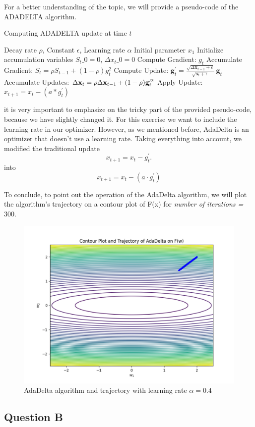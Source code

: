 For a better understanding of the topic, we will provide a pseudo-code of the ADADELTA algorithm.
	\begin{algorithm}[H]
		\caption{Computing ADADELTA update at time $t$}
		\begin{algorithmic}
			\Require Decay rate $\rho$, Constant $\epsilon$, Learning rate $\alpha$
			\Require Initial parameter $x_1$
			\State Initialize accumulation variables $S_t\_0 = 0$, $\Delta x_t\_0 = 0$
			\State Compute Gradient: $g_t$
			\State Accumulate Gradient: $S_t = \rho S_{t-1} + (1 - \rho)g_t^2$
			\State Compute Update: $	\mathbf{g}_{t}^{\prime}={\frac{\sqrt{\Delta\mathbf{x}_{t-1}+\epsilon}}{\sqrt{\mathbf{s}_{t}+\epsilon}}}~\mathbf{g}_{t}$
			\State Accumulate Updates: 	$\Delta{\bf x}_{t}=\rho\Delta{\bf x}_{t-1}+(1-\rho){\bf g}_{t}^{\prime2}$
			\State Apply Update: $x_{t+1} = x_t - (a*g_{t}^{\prime})$
			\EndFor
		\end{algorithmic}
	\end{algorithm}
it is very important to emphasize on the tricky part of the provided pseudo-code, because we have slightly changed it. For this exercise we want to include the learning rate in our optimizer. However, as we mentioned before, AdaDelta is an optimizer that doesn't use a learning rate. Taking everything into account, we modified the traditional update
\begin{equation}
	{x}_{t+1}={x}_{t}-{g}_{t}^{\prime}.
\end{equation}
into
\begin{equation}
	x_{t+1} = x_t - (a \cdot g_{t}^{\prime})
\end{equation}

To conclude, to point out the operation of the AdaDelta algorithm, we will plot the algorithm’s trajectory on a contour plot of F(x) for \textit{number of iterations = $300$}.
\begin{figure}[H]
	\centering
	\includegraphics[width=.7\textwidth]{../Problem 8/ADADELTA_04.pdf}
	\caption{AdaDelta algorithm and trajectory with learning rate $\alpha=0.4$}
	\label{fig:lr=0.4}
\end{figure}
\vspace{2mm}

\subsection{Question B}
